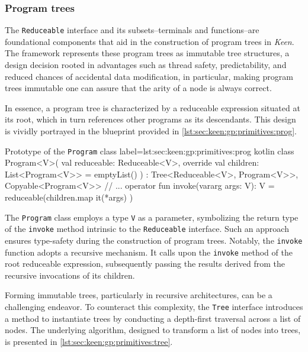 
\subsubsection{Program trees}
  The \texttt{Reduceable} interface and its subsets--terminals and 
  functions--are foundational components that aid in the construction of 
  program trees in \textit{Keen}. The framework represents these program 
  trees as immutable tree structures, a design decision rooted in advantages 
  such as thread safety, predictability, and reduced chances of accidental 
  data modification, in particular, making program trees immutable one can 
  assure that the arity of a node is always correct.

  In essence, a program tree is characterized by a reduceable expression 
  situated at its root, which in turn references other programs as its 
  descendants. This design is vividly portrayed in the blueprint provided in 
  \vref{lst:sec:keen:gp:primitives:prog}.

  \begin{code}{Prototype of the \texttt{Program} class}{
    label=lst:sec:keen:gp:primitives:prog
  }{kotlin}
    class Program<V>(
      val reduceable: Reduceable<V>,
      override val children: List<Program<V>> = emptyList()
    ) : Tree<Reduceable<V>, Program<V>>, Copyable<Program<V>> {
      // ...
      operator fun invoke(vararg args: V): V = reduceable(children.map { it(*args) })
    }
  \end{code}

  The \texttt{Program} class employs a type \texttt{V} as a parameter, 
  symbolizing the return type of the \texttt{invoke} method intrinsic to the 
  \texttt{Reduceable} interface. Such an approach ensures type-safety during the 
  construction of program trees. Notably, the \texttt{invoke} function adopts a 
  recursive mechanism. It calls upon the \texttt{invoke} method of the root 
  reduceable expression, subsequently passing the results derived from the 
  recursive invocations of its children.

  Forming immutable trees, particularly in recursive architectures, can be a 
  challenging endeavor. To counteract this complexity, the \texttt{Tree} 
  interface introduces a method to instantiate trees by conducting a depth-first 
  traversal across a list of nodes. The underlying algorithm, designed to 
  transform a list of nodes into trees, is presented in 
  \vref{lst:sec:keen:gp:primitives:tree}.

